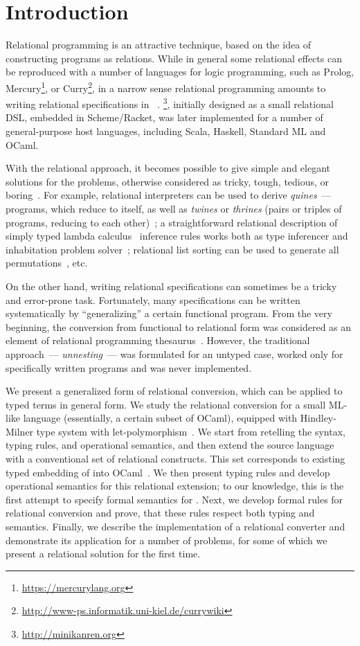 \section{Introduction}
\label{intro}

Relational programming is an attractive technique, based on the idea of constructing programs as relations.
While in general some relational effects can be reproduced with a number of languages for logic programming, such as
Prolog, Mercury\footnote{\url{https://mercurylang.org}}, or Curry\footnote{\url{http://www-ps.informatik.uni-kiel.de/currywiki}}, in
a narrow sense relational programming amounts to writing relational specifications in \miniKanren~\cite{TRS}. \miniKanren\footnote{\url{http://minikanren.org}},
initially designed as a small relational DSL, embedded in Scheme/Racket, was later implemented for a number of general-purpose host languages,
including Scala, Haskell, Standard ML and OCaml.

With the relational approach, it becomes possible to give simple and elegant solutions for the problems, otherwise
considered as tricky, tough, tedious, or boring~\cite{unified}. For example, relational interpreters can be used to derive
\emph{quines}~--- programs, which reduce to itself, as well as \emph{twines} or \emph{thrines} (pairs or triples of
programs, reducing to each other)~\cite{Untagged}; a straightforward relational description of
simply typed lambda calculus~\cite{Lambda} inference rules works both as type inferencer and inhabitation problem solver~\cite{WillThesis};
relational list sorting can be used to generate all permutations~\cite{ocanren}, etc. 

On the other hand, writing relational specifications can sometimes be a tricky and error-prone task. Fortunately, many 
specifications can be written systematically by ``generalizing'' a certain functional program. From the very beginning, 
the conversion from functional to relational form was considered as an element of relational programming thesaurus~\cite{TRS}. However,
the traditional approach~--- \emph{unnesting}~--- was formulated for an untyped case, worked only for specifically written
programs and was never implemented.

We present a generalized form of relational conversion, which can be applied to typed terms in general form. We study the relational conversion 
for a small ML-like language (essentially, a certain subset of OCaml), equipped with Hindley-Milner type system with let-polymorphism~\cite{Types}. 
We start from retelling the syntax, typing rules, and operational semantics, and then extend the source language with a conventional set of 
relational constructs. This set corresponds to existing typed embedding of \miniKanren into OCaml~\cite{ocanren}. We then present typing rules and 
develop operational semantics for this relational extension; to our knowledge, this is the first attempt to specify formal semantics for
\miniKanren. Next, we develop formal rules for relational conversion and prove, that these rules respect both typing and
semantics. Finally, we describe the implementation of a relational converter and demonstrate its application for a number of problems, for some
of which we present a relational solution for the first time.
